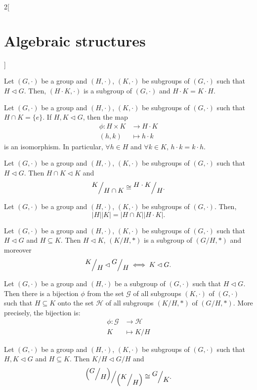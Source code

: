 \documentclass[../../../main.tex]{subfiles}
\begin{document}
\begin{multicols}{2}[\section{Algebraic structures}]
\begin{definition}
\end{definition}
\begin{prop}
    Let $(G,\cdot)$ be a group and $(H,\cdot)$, $(K,\cdot)$ be subgroups of $(G,\cdot)$ such that $H\lhd G$. Then, $(H\cdot K,\cdot)$ is a subgroup of $(G,\cdot)$ and $H\cdot K=K\cdot H$.
\end{prop}
\begin{prop}
    Let $(G,\cdot)$ be a group and $(H,\cdot)$, $(K,\cdot)$ be subgroups of $(G,\cdot)$ such that $H\cap K=\{e\}$. If $H,K\lhd G$, then the map 
    \begin{align*}
        \phi:H\times K&\longrightarrow H\cdot K\\
        (h,k)&\longmapsto h\cdot k
    \end{align*}
    is an isomorphism. In particular, $\forall h\in H$ and $\forall k\in K$, $h\cdot k=k\cdot h$.
\end{prop}
\begin{theorem}
    Let $(G,\cdot)$ be a group and $(H,\cdot)$, $(K,\cdot)$ be subgroups of $(G,\cdot)$ such that $H\lhd G$. Then $H\cap K\lhd K$ and $$\quot{K}{H\cap K}\cong\quot{H\cdot K}{H}.$$
\end{theorem}
\begin{corollary}
    Let $(G,\cdot)$ be a group and $(H,\cdot)$, $(K,\cdot)$ be subgroups of $(G,\cdot)$. Then, $$|H||K|=|H\cap K||H\cdot K|.$$
\end{corollary}
\begin{lemma}
    Let $(G,\cdot)$ be a group and $(H,\cdot)$, $(K,\cdot)$ be subgroups of $(G,\cdot)$ such that $H\lhd G$ and $H\subseteq K$. Then $H\lhd K$, $(K/H,*)$ is a subgroup of $(G/H,*)$ and moreover $$\quot{K}{H}\lhd\quot{G}{H}\iff K\lhd G.$$
\end{lemma}
\begin{theorem}
    Let $(G,\cdot)$ be a group and $(H,\cdot)$ be a subgroup of $(G,\cdot)$ such that $H\lhd G$. Then there is a bijection $\phi$ from the set $\mathcal{G}$ of all subgroups $(K,\cdot)$ of $(G,\cdot)$ such that $H\subseteq K$ onto the set $\mathcal{H}$ of all subgroups $\left(K/H,*\right)$ of $\left(G/H,*\right)$. More precisely, the bijection is:
    \begin{align*}
        \phi:\mathcal{G}&\longrightarrow\mathcal{H}\\
        K&\longmapsto K/H
    \end{align*}
\end{theorem}
\begin{theorem}
    Let $(G,\cdot)$ be a group and $(H,\cdot)$, $(K,\cdot)$ be subgroups of $(G,\cdot)$ such that $H,K\lhd G$ and $H\subseteq K$. Then $K/H\lhd G/H$ and $$\quot{\left(\quot{G}{H}\right)}{\left(\quot{K}{H}\right)}\cong\quot{G}{K}.$$
\end{theorem}

\end{multicols}
\end{document}
